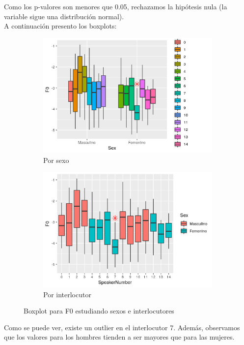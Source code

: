 Como los p-valores son menores que 0.05, rechazamos la hipótesis nula (la variable sigue una distribución normal). \\


A continuación presento los boxplots:

\begin{figure}[H]
	\centering
	\begin{subfigure}{.5\textwidth}
		\centering
		\includegraphics[width=.9\linewidth]{bps0.png}
		\caption{Por sexo}
		\label{fig:bps0}
	\end{subfigure}%
	\begin{subfigure}{.5\textwidth}
		\centering
		\includegraphics[width=.9\linewidth]{bpsn0.png}
		\caption{Por interlocutor}
		\label{fig:bpsn0}
	\end{subfigure}
	\caption{Boxplot para F0 estudiando sexos e interlocutores}
	\label{fig:bf0}
\end{figure}

Como se puede ver, existe un outlier en el interlocutor 7. Además, observamos que los valores para los hombres tienden a ser mayores que para las mujeres. \\

